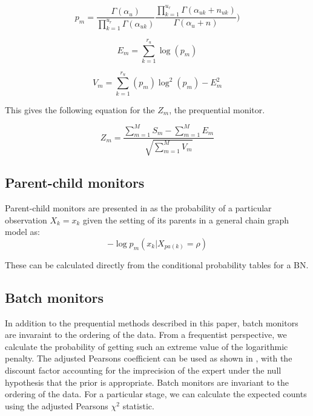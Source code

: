 \documentclass[12pt]{article}
\begin{document}
\begin{equation}
p_m= \frac{\Gamma(\alpha_u)}{\prod_{k=1}^{u_r} \Gamma(\alpha_{uk})} \frac{\prod_{k=1}^{u_r}\Gamma(\alpha_{uk} + n_{uk})}{\Gamma(\alpha_u + n)})
\end{equation}

\begin{equation}
E_m = \sum_{k=1}^{r_u}  \log (p_m)
\end{equation} 

\begin{equation}
V_m = \sum_{k=1}^{r_u} (p_m) \log^2 (p_m) - E_m^2
\end{equation}

This gives the following equation for the $Z_m$, the prequential monitor. 

\[
Z_m = \frac{\sum_{m=1}^{M} S_m - \sum_{m=1}^{M} E_m}{\sqrt{\sum_{m=1}^{M} V_m}}
\]



\subsection{Parent-child monitors}

%
Parent-child monitors are presented in \cite{diagnostics} as the probability of a particular observation $X_k = x_k$ given the setting of its parents in a general chain graph model as:
\begin{equation}
-\log p_m (x_k | X_{pa(k)}=\rho)
\end{equation}

These can be calculated directly from the conditional probability tables for a BN. 

\subsection{Batch monitors}

In addition to the prequential methods described in this paper, batch monitors are invaraint to the ordering of the data. From a frequentist perspective, we calculate the probability of getting such an extreme value of the logarithmic penalty.  The adjusted Pearsons coefficient can be used as shown in \cite{Spiegelhalter1994}, with the discount factor accounting for the imprecision of the expert under the null hypothesis that the prior is appropriate. 
Batch monitors are invariant to the ordering of the data. For a particular stage, we can calculate the expected counts using the adjusted Pearsons $\chi^2$ statistic.   
\end{document}
